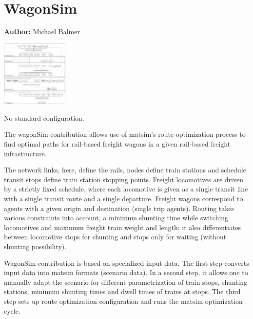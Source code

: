 \chapter{WagonSim}
\label{ch:wagonSim}

\hfill \textbf{Author:} Michael Balmer

\begin{center} \includegraphics[width=0.25\textwidth, angle=0]{extending/figures/wagonsim/wagonSimProcessChain.png} \end{center}



\createStandardInformationBasic%
{}%
{}%
{No standard configuration.}
{-}

The wagonSim \gls{contribution} allows use of \gls{matsim}'s route-optimization process to find optimal paths for rail-based freight wagons in a given rail-based freight infrastructure.

The network links, here, define the rails, nodes define train stations and schedule transit stops define train station stopping points. 
Freight locomotives are driven by a strictly fixed schedule, where each locomotive is given as a single transit line with a single transit route and a single departure. 
Freight wagons correspond to agents with a given origin and destination (single trip agents). 
Routing takes various constraints into account, \ie a minimum shunting time while switching locomotives and maximum freight train weight and length; it also differentiates between locomotive stops for shunting and stops  only for waiting (without shunting possibility).

WagonSim \gls{contribution} is based on specialized input data. 
The first step converts input data into \gls{matsim} formats (scenario data). In a second step, it allows one to manually adapt the scenario for different parametrization of train stops, shunting stations, minimum shunting times and dwell times of trains at stops. 
The third step sets up route optimization configuration and runs the \gls{matsim} optimization cycle.

